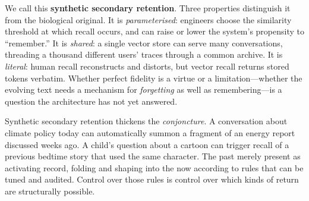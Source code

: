 We call this \textbf{synthetic secondary retention}. Three properties distinguish it from the biological original. It is \emph{parameterised}: engineers choose the similarity threshold at which recall occurs, and can raise or lower the system's propensity to ``remember.'' It is \emph{shared}: a single vector store can serve many conversations, threading a thousand different users' traces through a common archive. It is \emph{literal}: human recall reconstructs and distorts, but vector recall returns stored tokens verbatim. Whether perfect fidelity is a virtue or a limitation---whether the evolving text needs a mechanism for \emph{forgetting} as well as remembering---is a question the architecture has not yet answered.

Synthetic secondary retention thickens the \emph{conjoncture}. A conversation about climate policy today can automatically summon a fragment of an energy report discussed weeks ago. A child's question about a cartoon can trigger recall of a previous bedtime story that used the same character. The past merely present as activating record, folding and shaping into the now according to rules that can be tuned and audited. Control over those rules is control over which kinds of return are structurally possible.


